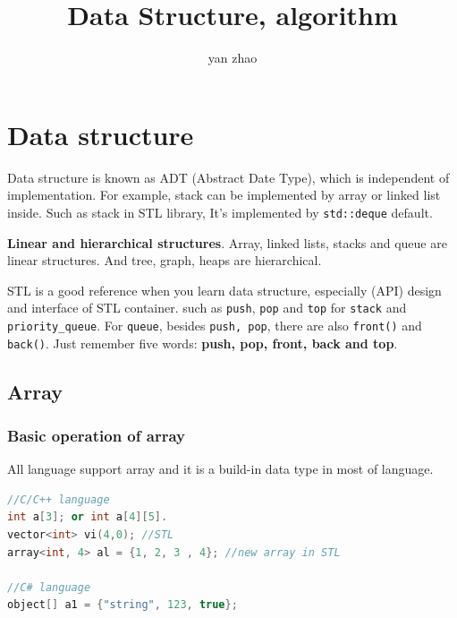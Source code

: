 \documentclass[a4paper,11pt,twoside]{book}
\begin{document}
\title{Data Structure, algorithm}
\author{yan zhao}
\date{}\maketitle

\setcounter{secnumdepth}{4}
\setcounter{tocdepth}{4}
\tableofcontents

\setlength\parindent{0pt}
\setlength{\parskip}{5pt}

\chapter{Data structure} 

	\par Data structure is known as ADT (Abstract Date Type),  which is independent of implementation. For example, stack can be implemented by array or linked list inside. Such as stack in STL library, It's implemented by \texttt{std::deque} default.   
	
	\par \textbf{Linear and hierarchical structures}. Array, linked lists, stacks and queue are linear structures. And tree, graph, heaps are hierarchical.
	
	\par STL is a good reference when you learn data structure, especially (API) design and interface of STL container. such as \texttt{push}, \texttt{pop}  and \texttt{top} for \texttt{stack} and \texttt{priority\_queue}. For \texttt{queue}, besides \texttt{push, pop},  there are also \texttt{front()} and \texttt{back()}. Just remember five words: \textbf{push, pop, front, back and top}.
	
\section{Array}

\subsection{Basic operation of array}

	All language support array and it is a build-in data type in most of language.  
\begin{lstlisting}[frame=single, language=c++]
//C/C++ language
int a[3]; or int a[4][5].  
vector<int> vi(4,0); //STL
array<int, 4> al = {1, 2, 3 , 4}; //new array in STL
  
//C# language 
object[] a1 = {"string", 123, true};
\end{lstlisting}
\end{document}
